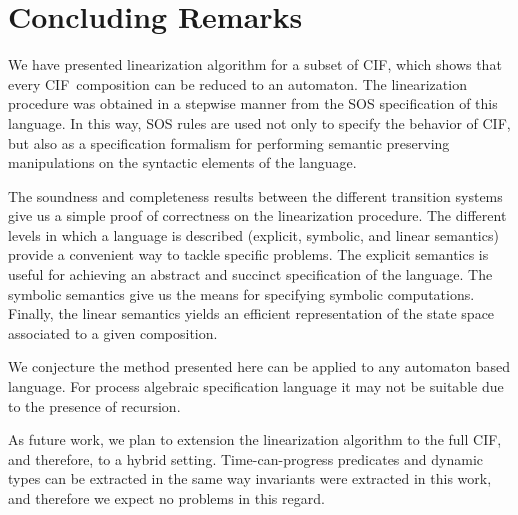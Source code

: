 \documentclass[submission,copyright,creativecommons,sharealike]{eptcs}
\newcommand{\CIF}{{CIF}}
\begin{document}
\section{Concluding Remarks}
\label{sec:concluding-remarks}

We have presented linearization algorithm for a subset of \CIF, which
shows that every \CIF\ composition can be reduced to an automaton.
The linearization procedure was obtained in a stepwise manner from the
SOS specification of this language.
In this way, SOS rules are used not only to specify the behavior of
\CIF, but also as a specification formalism for performing semantic
preserving manipulations on the syntactic elements of the language.

The soundness and completeness results between the different
transition systems give us a simple proof of correctness on the
linearization procedure. The different levels in which a language is
described (explicit, symbolic, and linear semantics) provide a
convenient way to tackle specific problems. The explicit semantics is
useful for achieving an abstract and succinct specification of the
language. The symbolic semantics give us the means for specifying
symbolic computations. Finally, the linear semantics yields an
efficient representation of the state space associated to a given
composition.

We conjecture the method presented here can be applied to any
automaton based language. For process algebraic specification language
it may not be suitable due to the presence of recursion.

As future work, we plan to extension the linearization algorithm to
the full CIF, and therefore, to a hybrid setting. Time-can-progress
predicates and dynamic types can be extracted in the same way
invariants were extracted in this work, and therefore we expect no
problems in this regard.



\end{document}
